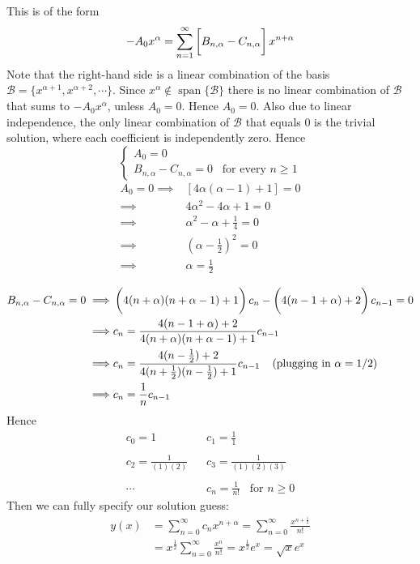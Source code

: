 \documentclass[12pt]{article}
\begin{document}
{This is of the form
\begin{align*}
-A_0 x^\alpha = \sum_{n=1}^\infty \left[ \vphantom{\frac{1}{1} }B_{n,\alpha} - C_{n,\alpha} \right] x^{n+\alpha} \\
\end{align*}
Note that the right-hand side is a linear combination of the basis $\mathcal{B} = \{x^{\alpha + 1}, x^{\alpha + 2}, \cdots\}$. Since $x^{\alpha} \notin \operatorname{span} \{\mathcal{B}\}$
 there is no linear combination of $\mathcal{B}$ that sums to $-A_0 x^\alpha$, unless $A_0 = 0$. Hence $A_0 = 0$. Also due to linear independence, the only linear combination of $\mathcal{B}$ that equals $0$ is the trivial solution, where each coefficient is independently zero. Hence
$$\begin{cases}
A_0 = 0 \\
B_{n,\alpha} - C_{n,\alpha} = 0 \;\;\; \text{for every $n \geq 1$}
\end{cases}$$
\begin{align*}
A_0 = 0 \implies& [ 4\alpha (\alpha - 1) + 1] = 0 \\
\implies& 4\alpha^2 - 4\alpha + 1 = 0 \\
\implies& \alpha^2 - \alpha + \frac{1}{4} = 0 \\ 
\implies& \left( \alpha - \frac{1}{2} \right)^2= 0 \\
\implies& \alpha = \frac{1}{2} \\
\end{align*}
\begin{align*}
B_{n,\alpha} - C_{n,\alpha} = 0 \implies& \left( \vphantom{\frac{1}{1}} 4(n + \alpha)(n + \alpha - 1) + 1 \right) c_n - \left( \vphantom{\frac{1}{1}} 4(n-1+\alpha) + 2 \right) c_{n-1} = 0 \\
\implies& c_n = \frac{4(n-1+\alpha) + 2}{4(n + \alpha)(n + \alpha - 1) + 1} c_{n-1} \\
\implies& c_n = \frac{4(n-\frac{1}{2}) + 2}{4(n + \frac{1}{2})(n - \frac{1}{2}) + 1} c_{n-1} \;\;\;\; \text{(plugging in $\alpha = 1/2$)} \\
\implies& c_n = \frac{1}{n} c_{n-1} 
\end{align*}
Hence
\begin{align*}
c_0 = 1 &\;\;\; c_1 = \frac{1}{1} \\ \\
c_2 = \frac{1}{(1)(2)} &\;\;\; c_3 = \frac{1}{(1)(2)(3)} \\ \\
\cdots &\;\;\; c_n = \frac{1}{n!} \;\;\; \text{for $n \geq 0$}
\end{align*}
Then we can fully specify our solution guess:
\begin{align*}
y(x) &= \sum_{n=0}^\infty c_n x^{n + \alpha} = \sum_{n=0}^\infty \frac{ x^{n + \frac{1}{2}} }{n!} \\
&= x^{\frac{1}{2}} \sum_{n=0}^\infty \frac{ x^{n} }{n!} = x^{\frac{1}{2}}  e^x = \boxed{\sqrt{x} e^x}
\end{align*}
}
\end{document}
